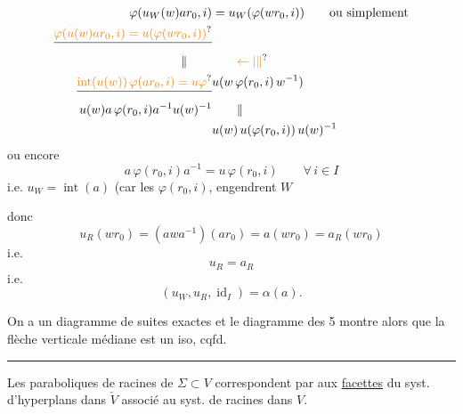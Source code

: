 \[
\begin{aligned}
\varphi(u_W(w)ar_0,i)&=u_W(\varphi(wr_0,i))\qquad\text{ou simplement}\\
\deleted{\unsure{\varphi(u(w)ar_0,i)=u(\varphi(wr_0,i))}}&\\
\Vert\qquad &\qquad\unsure{\leftarrow|\Vert}\\
\deleted{\unsure{\operatorname{int}(u(w))\,\varphi(ar_0,i)=u\varphi}} & u(w\,\varphi(r_0,i)\,w^{-1})\\
u(w)a\,\varphi(r_0,i)a^{-1}u(w)^{-1}&\qquad\Vert\\
&u(w)\,u(\varphi(r_0,i))\,u(w)^{-1}
\end{aligned}
\]
 ou encore
\[
 a\,\varphi(r_0,i)a^{-1}=u\,\varphi(r_0,i)\qquad\forall\,i\in I
\]
i.e. $u_W=\operatorname{int}(a)$ (car les $\varphi(r_0,i)$,  engendrent $W$

donc
\[
u_R(wr_0)=(awa^{-1})(ar_0)=a(wr_0)=a_R(wr_0)
\]
i.e.
\[
u_R=a_R
\]
i.e.
\[
(u_W,u_R,\operatorname{id}_I)=\alpha(a).
\]

On a  un diagramme de suites exactes
et le diagramme des 5  montre alors que la flèche verticale médiane est un iso, cqfd.

\begin{center}\rule{2.5cm}{0.35pt}\end{center}

Les   paraboliques de racines de $\Sigma\subset V$  correspondent   par   aux \uline{facettes}  du syst. d'hyperplans dans $\check V$ associé au syst. de racines dans $V$.

